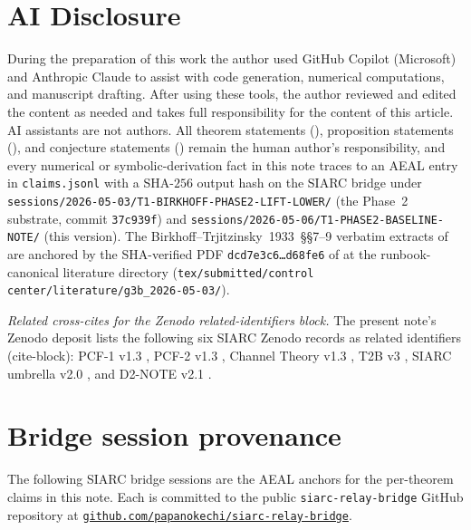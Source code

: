 \documentclass[11pt,reqno]{amsart}
\theoremstyle{plain}
\theoremstyle{definition}
\theoremstyle{remark}
\begin{document}
\section*{AI Disclosure}

During the preparation of this work the author used GitHub
Copilot (Microsoft) and Anthropic Claude to assist with code
generation, numerical computations, and manuscript drafting.
After using these tools, the author reviewed and edited the
content as needed and takes full responsibility for the
content of this article. AI assistants are not authors. All
theorem statements (), proposition
statements (), and conjecture
statements () remain the human author's
responsibility, and every numerical or symbolic-derivation
fact in this note traces to an AEAL entry in
\texttt{claims.jsonl} with a SHA-$256$ output hash on the
SIARC bridge under \texttt{sessions/2026-05-03/T1-BIRKHOFF-PHASE2-LIFT-LOWER/}
(the Phase~2 substrate, commit \texttt{37c939f}) and
\texttt{sessions/2026-05-06/T1-PHASE2-BASELINE-NOTE/} (this
version). The Birkhoff--Trjitzinsky~1933~\S\S7--9 verbatim
extracts of  are anchored by the SHA-verified PDF
\texttt{dcd7e3c6\dots d68fe6} of
\cite{birkhoff_trjitzinsky_1933} at the runbook-canonical
literature directory
(\texttt{tex/submitted/control center/literature/g3b\_2026-05-03/}).

\medskip
\noindent\emph{Related cross-cites for the Zenodo
related-identifiers block.}
The present note's Zenodo deposit lists the following six
SIARC Zenodo records as related identifiers (cite-block):
PCF-1 v1.3 \cite{papanokechi_pcf1_v13},
PCF-2 v1.3 \cite{papanokechi_pcf2_v13},
Channel Theory v1.3 \cite{siarc_channel_theory_v13},
T2B v3 \cite{siarc_t2b_v3},
SIARC umbrella v2.0 \cite{siarc_umbrella_v2}, and
D2-NOTE v2.1 \cite{siarc_d2_note_v21}.

\appendix

\section{Bridge session provenance}
\label{app:provenance}

The following SIARC bridge sessions are the AEAL anchors for
the per-theorem claims in this note. Each is committed to the
public \texttt{siarc-relay-bridge} GitHub repository at
\href{https://github.com/papanokechi/siarc-relay-bridge}{\nolinkurl{github.com/papanokechi/siarc-relay-bridge}}.
\end{document}
